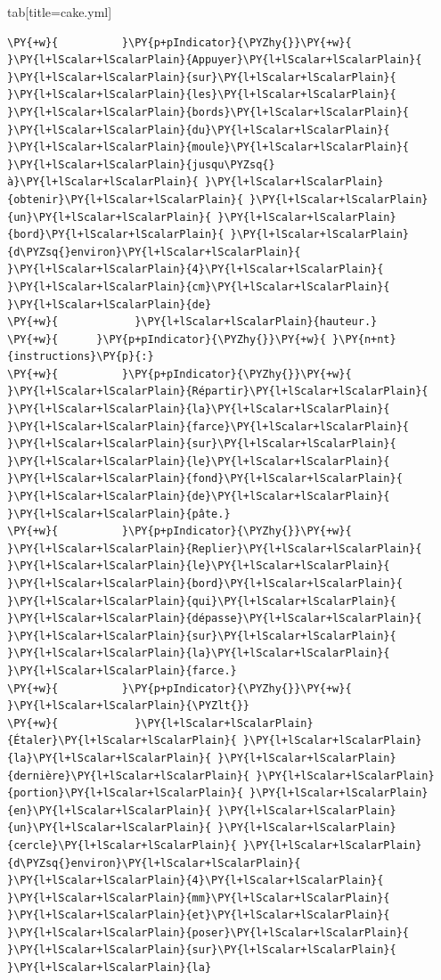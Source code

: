 \documentclass[a4paper,twoside]{article}
\begin{document}
\begin{tsdiv}{tab}[title=cake.yml]
\begin{tscode}[lang=yaml, engine=pygments]
\begin{Verbatim}[commandchars=\\\{\},breaklines, breakanywhere, commandchars=\\\{\}]
\PY{+w}{          }\PY{p+pIndicator}{\PYZhy{}}\PY{+w}{ }\PY{l+lScalar+lScalarPlain}{Appuyer}\PY{l+lScalar+lScalarPlain}{ }\PY{l+lScalar+lScalarPlain}{sur}\PY{l+lScalar+lScalarPlain}{ }\PY{l+lScalar+lScalarPlain}{les}\PY{l+lScalar+lScalarPlain}{ }\PY{l+lScalar+lScalarPlain}{bords}\PY{l+lScalar+lScalarPlain}{ }\PY{l+lScalar+lScalarPlain}{du}\PY{l+lScalar+lScalarPlain}{ }\PY{l+lScalar+lScalarPlain}{moule}\PY{l+lScalar+lScalarPlain}{ }\PY{l+lScalar+lScalarPlain}{jusqu\PYZsq{}à}\PY{l+lScalar+lScalarPlain}{ }\PY{l+lScalar+lScalarPlain}{obtenir}\PY{l+lScalar+lScalarPlain}{ }\PY{l+lScalar+lScalarPlain}{un}\PY{l+lScalar+lScalarPlain}{ }\PY{l+lScalar+lScalarPlain}{bord}\PY{l+lScalar+lScalarPlain}{ }\PY{l+lScalar+lScalarPlain}{d\PYZsq{}environ}\PY{l+lScalar+lScalarPlain}{ }\PY{l+lScalar+lScalarPlain}{4}\PY{l+lScalar+lScalarPlain}{ }\PY{l+lScalar+lScalarPlain}{cm}\PY{l+lScalar+lScalarPlain}{ }\PY{l+lScalar+lScalarPlain}{de}
\PY{+w}{            }\PY{l+lScalar+lScalarPlain}{hauteur.}
\PY{+w}{      }\PY{p+pIndicator}{\PYZhy{}}\PY{+w}{ }\PY{n+nt}{instructions}\PY{p}{:}
\PY{+w}{          }\PY{p+pIndicator}{\PYZhy{}}\PY{+w}{ }\PY{l+lScalar+lScalarPlain}{Répartir}\PY{l+lScalar+lScalarPlain}{ }\PY{l+lScalar+lScalarPlain}{la}\PY{l+lScalar+lScalarPlain}{ }\PY{l+lScalar+lScalarPlain}{farce}\PY{l+lScalar+lScalarPlain}{ }\PY{l+lScalar+lScalarPlain}{sur}\PY{l+lScalar+lScalarPlain}{ }\PY{l+lScalar+lScalarPlain}{le}\PY{l+lScalar+lScalarPlain}{ }\PY{l+lScalar+lScalarPlain}{fond}\PY{l+lScalar+lScalarPlain}{ }\PY{l+lScalar+lScalarPlain}{de}\PY{l+lScalar+lScalarPlain}{ }\PY{l+lScalar+lScalarPlain}{pâte.}
\PY{+w}{          }\PY{p+pIndicator}{\PYZhy{}}\PY{+w}{ }\PY{l+lScalar+lScalarPlain}{Replier}\PY{l+lScalar+lScalarPlain}{ }\PY{l+lScalar+lScalarPlain}{le}\PY{l+lScalar+lScalarPlain}{ }\PY{l+lScalar+lScalarPlain}{bord}\PY{l+lScalar+lScalarPlain}{ }\PY{l+lScalar+lScalarPlain}{qui}\PY{l+lScalar+lScalarPlain}{ }\PY{l+lScalar+lScalarPlain}{dépasse}\PY{l+lScalar+lScalarPlain}{ }\PY{l+lScalar+lScalarPlain}{sur}\PY{l+lScalar+lScalarPlain}{ }\PY{l+lScalar+lScalarPlain}{la}\PY{l+lScalar+lScalarPlain}{ }\PY{l+lScalar+lScalarPlain}{farce.}
\PY{+w}{          }\PY{p+pIndicator}{\PYZhy{}}\PY{+w}{ }\PY{l+lScalar+lScalarPlain}{\PYZlt{}}
\PY{+w}{            }\PY{l+lScalar+lScalarPlain}{Étaler}\PY{l+lScalar+lScalarPlain}{ }\PY{l+lScalar+lScalarPlain}{la}\PY{l+lScalar+lScalarPlain}{ }\PY{l+lScalar+lScalarPlain}{dernière}\PY{l+lScalar+lScalarPlain}{ }\PY{l+lScalar+lScalarPlain}{portion}\PY{l+lScalar+lScalarPlain}{ }\PY{l+lScalar+lScalarPlain}{en}\PY{l+lScalar+lScalarPlain}{ }\PY{l+lScalar+lScalarPlain}{un}\PY{l+lScalar+lScalarPlain}{ }\PY{l+lScalar+lScalarPlain}{cercle}\PY{l+lScalar+lScalarPlain}{ }\PY{l+lScalar+lScalarPlain}{d\PYZsq{}environ}\PY{l+lScalar+lScalarPlain}{ }\PY{l+lScalar+lScalarPlain}{4}\PY{l+lScalar+lScalarPlain}{ }\PY{l+lScalar+lScalarPlain}{mm}\PY{l+lScalar+lScalarPlain}{ }\PY{l+lScalar+lScalarPlain}{et}\PY{l+lScalar+lScalarPlain}{ }\PY{l+lScalar+lScalarPlain}{poser}\PY{l+lScalar+lScalarPlain}{ }\PY{l+lScalar+lScalarPlain}{sur}\PY{l+lScalar+lScalarPlain}{ }\PY{l+lScalar+lScalarPlain}{la}

\end{Verbatim}
\end{tscode}
\end{tsdiv}
\end{document}
